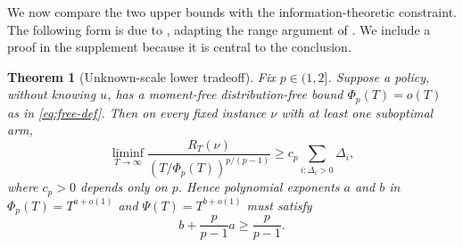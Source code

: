 \documentclass[twoside]{article}
\newtheorem{theorem}{Theorem}
\begin{document}
We now compare the two upper bounds with the information-theoretic
constraint. The following form is due to \citet{genalti2025lower}, adapting
the range argument of \citet{hadiji2023range}. We include a proof in the
supplement because it is central to the conclusion.

\begin{theorem}[Unknown-scale lower tradeoff]
\label{thm:lower}
Fix $p\in(1,2]$. Suppose a policy, without knowing $u$, has a moment-free
distribution-free bound $\Phi_p(T)=o(T)$ as in \eqref{eq:free-def}. Then on
every fixed instance $\nu$ with at least one suboptimal arm,
\begin{equation}
 \liminf_{T\to\infty}
 \frac{R_T(\nu)}{(T/\Phi_p(T))^{p/(p-1)}}
 \geq c_p\sum_{i:\Delta_i>0}\Delta_i,
 \label{eq:lower-tradeoff}
\end{equation}
where $c_p>0$ depends only on $p$.
Hence polynomial exponents $a$ and $b$ in
$\Phi_p(T)=T^{a+o(1)}$ and $\Psi(T)=T^{b+o(1)}$ must satisfy
\begin{equation}
 b+\frac{p}{p-1}a\geq\frac{p}{p-1}.
 \label{eq:exponent-lower}
\end{equation}
\end{theorem}
\end{document}
